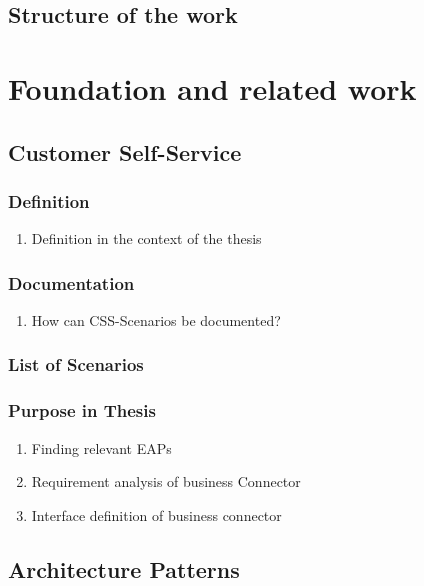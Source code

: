 \documentclass[
     12pt,         %
     a4paper,      %
     BCOR10mm,     %
     DIV14,        %
     ]{scrreprt}
\begin{document}
\section{Structure of the work}

\newpage

\chapter{Foundation and related work}

\section{Customer Self-Service}

\subsection{Definition}
\begin{enumerate}
     \item Definition in the context of the thesis
\end{enumerate}

\subsection{Documentation}
\begin{enumerate}
     \item How can CSS-Scenarios be documented?
\end{enumerate}

\subsection{List of Scenarios}

\subsection{Purpose in Thesis}
\begin{enumerate}
     \item Finding relevant EAPs
     \item Requirement analysis of business Connector
     \item Interface definition of business connector
\end{enumerate}


\section{Architecture Patterns}
\end{document}

